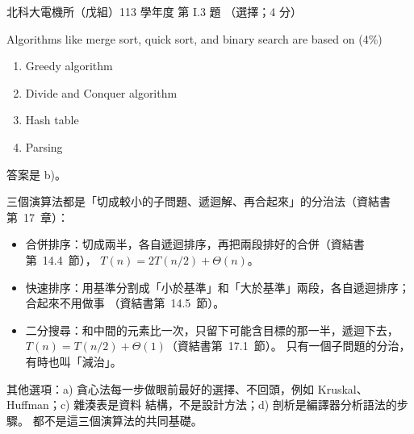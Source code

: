\begin{pastexam}[label={px:ntut-113-ee-ds-03}]{北科大電機所（戊組）113 學年度 第 I.3 題}
（選擇；4 分）

Algorithms like merge sort, quick sort, and binary search are based on (4\%)
\begin{enumerate}[label=\alph*)]
\item Greedy algorithm
\item Divide and Conquer algorithm
\item Hash table
\item Parsing
\end{enumerate}
\end{pastexam}

\begin{pastsoln}
答案是 b)。

三個演算法都是「切成較小的子問題、遞迴解、再合起來」的分治法（資結書第~17~章）：
\begin{itemize}
\item 合併排序：切成兩半，各自遞迴排序，再把兩段排好的合併（資結書第~14.4~節），
$T(n) = 2T(n/2) + \Theta(n)$。
\item 快速排序：用基準分割成「小於基準」和「大於基準」兩段，各自遞迴排序；合起來不用做事
（資結書第~14.5~節）。
\item 二分搜尋：和中間的元素比一次，只留下可能含目標的那一半，遞迴下去，
$T(n) = T(n/2) + \Theta(1)$（資結書第~17.1~節）。 只有一個子問題的分治，有時也叫「減治」。
\end{itemize}
其他選項：a) 貪心法每一步做眼前最好的選擇、不回頭，例如 Kruskal、Huffman；c) 雜湊表是資料
結構，不是設計方法；d) 剖析是編譯器分析語法的步驟。 都不是這三個演算法的共同基礎。
\end{pastsoln}
